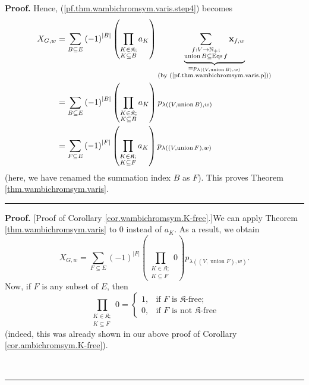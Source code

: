 \documentclass[numbers=enddot,12pt,final,onecolumn,notitlepage]{scrartcl}%
\theoremstyle{definition}
\newenvironment{proof}[1][Proof]{\noindent\textbf{#1.} }{\ \rule{0.5em}{0.5em}}
\newenvironment{verlong}{}{}
\let\sumnonlimits\sum
\let\prodnonlimits\prod
\renewcommand{\sum}{\sumnonlimits\limits}
\renewcommand{\prod}{\prodnonlimits\limits}
\begin{document}
\begin{verlong}
\begin{proof}
Hence, (\ref{pf.thm.wambichromsym.varis.step4}) becomes%
\begin{align*}
X_{G,w}  &  =\sum_{B\subseteq E}\left(  -1\right)  ^{\left\vert B\right\vert
}\left(  \prod_{\substack{K\in\mathfrak{K};\\K\subseteq B}}a_{K}\right)
\underbrace{\sum_{\substack{f:V\rightarrow\mathbb{N}_{+}%
;\\\operatorname*{union}B\subseteq\operatorname*{Eqs}f}}\mathbf{x}_{f,w}%
}_{\substack{=p_{\lambda\left(  \left(  V,\operatorname*{union}B\right)
,w\right)  }\\\text{(by (\ref{pf.thm.wambichromsym.varis.p}))}}}\\
&  =\sum_{B\subseteq E}\left(  -1\right)  ^{\left\vert B\right\vert }\left(
\prod_{\substack{K\in\mathfrak{K};\\K\subseteq B}}a_{K}\right)  p_{\lambda
\left(  \left(  V,\operatorname*{union}B\right)  ,w\right)  }\\
&  =\sum_{F\subseteq E}\left(  -1\right)  ^{\left\vert F\right\vert }\left(
\prod_{\substack{K\in\mathfrak{K};\\K\subseteq F}}a_{K}\right)  p_{\lambda
\left(  \left(  V,\operatorname*{union}F\right)  ,w\right)  }%
\end{align*}
(here, we have renamed the summation index $B$ as $F$). This proves Theorem
\ref{thm.wambichromsym.varis}.
\end{proof}

\begin{proof}
[Proof of Corollary \ref{cor.wambichromsym.K-free}.]We can apply Theorem
\ref{thm.wambichromsym.varis} to $0$ instead of $a_{K}$. As a result, we
obtain%
\begin{equation}
X_{G,w}=\sum_{F\subseteq E}\left(  -1\right)  ^{\left\vert F\right\vert
}\left(  \prod_{\substack{K\in\mathfrak{K};\\K\subseteq F}}0\right)
p_{\lambda\left(  \left(  V,\operatorname*{union}F\right)  ,w\right)  }.
\label{pf.cor.wambichromsym.K-free.0}%
\end{equation}
Now, if $F$ is any subset of $E$, then%
\begin{equation}
\prod_{\substack{K\in\mathfrak{K};\\K\subseteq F}}0=%
\begin{cases}
1, & \text{if }F\text{ is }\mathfrak{K}\text{-free;}\\
0, & \text{if }F\text{ is not }\mathfrak{K}\text{-free}%
\end{cases}
\label{pf.cor.wambichromsym.K-free.1}%
\end{equation}
(indeed, this was already shown in our above proof of Corollary
\ref{cor.ambichromsym.K-free}).


\end{proof}
\end{verlong}
\end{document}
